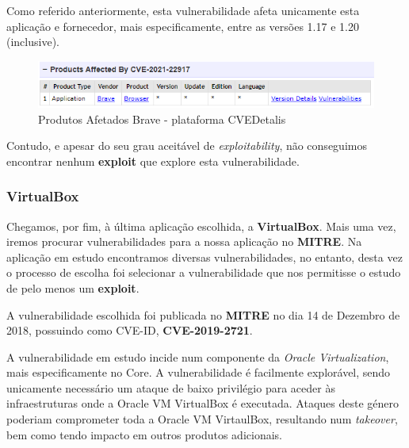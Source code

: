 \documentclass[11t]{article}
\begin{document}
Como referido anteriormente, esta vulnerabilidade afeta unicamente esta aplicação e fornecedor, mais especificamente, entre as versões 1.17 e 1.20 (inclusive).

\begin{figure}[H]
    \centering
    \includegraphics[width=1\textwidth]{images/produtosAfetadosBrave.png}
    \caption{Produtos Afetados Brave - plataforma CVEDetalis}
\end{figure}

\vspace{0.2cm}

Contudo, e apesar do seu grau aceitável de \textit{exploitability}, não conseguimos encontrar nenhum \textbf{exploit} que explore esta vulnerabilidade.

\vspace{0.75cm}



\subsubsection{VirtualBox}

Chegamos, por fim, à última aplicação escolhida, a \textbf{VirtualBox}. Mais uma vez, iremos procurar vulnerabilidades para a nossa aplicação no \textbf{MITRE}. Na aplicação em estudo encontramos diversas vulnerabilidades, no entanto, desta vez o processo de escolha foi selecionar a vulnerabilidade que nos permitisse o estudo de pelo menos um \textbf{exploit}.

\vspace{0.1cm}

A vulnerabilidade escolhida foi publicada no \textbf{MITRE} no dia 14 de Dezembro de 2018, possuindo como CVE-ID, \textbf{CVE-2019-2721}.

\vspace{0.1cm}

A vulnerabilidade em estudo incide num componente da \textit{Oracle Virtualization}, mais especificamente no Core. A vulnerabilidade é facilmente explorável, sendo unicamente necessário um ataque de baixo privilégio para aceder às infraestruturas onde a Oracle VM VirtualBox é executada. Ataques deste género poderiam comprometer toda a Oracle VM VirtaulBox, resultando num \textit{takeover}, bem como tendo impacto em outros produtos adicionais.
\end{document}
